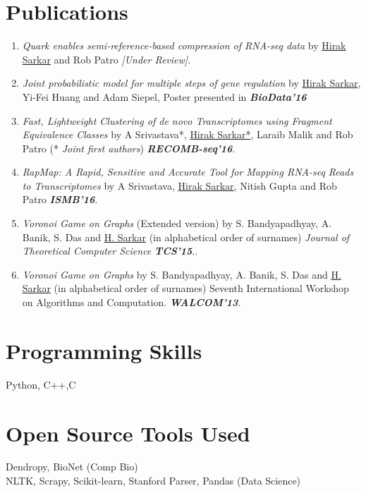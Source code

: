 \documentclass{res}
\begin{document}
\begin{resume}
\section{Publications}
\begin{enumerate}
\item   {\it Quark enables semi-reference-based compression of RNA-seq data} by  \underline{Hirak Sarkar} and Rob Patro {\em [Under Review]}.

\item {\it Joint probabilistic model for multiple steps of gene regulation} by \underline{Hirak Sarkar}, Yi-Fei Huang and Adam Siepel, Poster presented in  \textit{\textbf{BioData'16}}

\item   {\it Fast, Lightweight Clustering of de novo Transcriptomes using Fragment Equivalence Classes} by A Srivastava*, \underline{Hirak Sarkar*}, Laraib Malik and Rob Patro (* \textit{Joint first authors}) \textit{\textbf{RECOMB-seq'16}}. 


\item {\it RapMap: A Rapid, Sensitive and Accurate Tool for Mapping RNA-seq Reads to Transcriptomes} by A Srivastava, \underline{Hirak Sarkar}, Nitish Gupta and Rob Patro  \textit{\textbf{ISMB'16}}.

\item {\it Voronoi Game on Graphs} (Extended version) by S. Bandyapadhyay, A. Banik, S. Das and \underline{H. Sarkar} (in alphabetical order of surnames) {\it Journal of Theoretical Computer Science}  \textit{\textbf{TCS'15}}..

\item {\it Voronoi Game on Graphs} by  S. Bandyapadhyay, A. Banik, S. Das and \underline{H. Sarkar} (in alphabetical order of surnames) Seventh International Workshop on Algorithms and Computation. \textit{\textbf{WALCOM'13}}.
\end{enumerate}

\section{Programming Skills}
Python, C++,C

\section{\bf Open Source Tools Used}
Dendropy, BioNet  (Comp Bio) \\
NLTK, Scrapy, Scikit-learn, Stanford Parser, Pandas (Data Science) \\




\end{resume}
\end{document}
